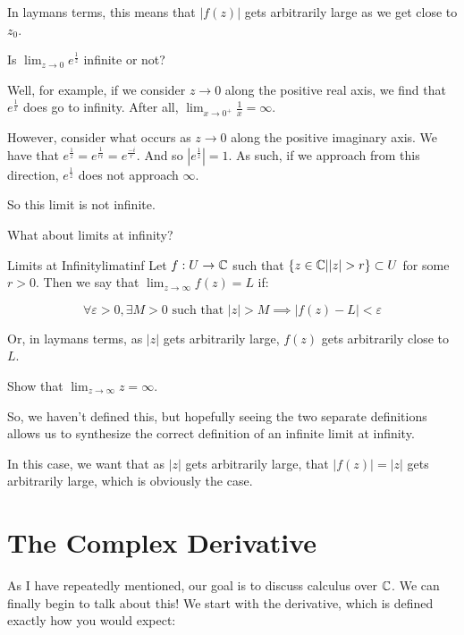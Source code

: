 In laymans terms, this means that $|f(z)|$ gets arbitrarily large as we get close to $z_0$.

\begin{ex}{}{} Is $\lim_{z\rightarrow 0} e^{\frac{1}{z}}$ infinite or not?

Well, for example, if we consider $z\rightarrow 0$ along the positive real axis, we find that $e^{\frac{1}{x}}$ does go to infinity. After all, $\lim_{x\rightarrow 0^+}\frac{1}{x}=\infty$.

However, consider what occurs as $z\rightarrow 0$ along the positive imaginary axis. We have that $e^{\frac{1}{z}} = e^{\frac{1}{ri}} = e^{\frac{-i}{r}}$. And so $|e^{\frac{1}{z}}| = 1$. As such, if we approach from this direction, $e^{\frac{1}{z}}$ does not approach $\infty$.

So this limit is not infinite.
\end{ex}

What about limits at infinity?

\begin{defbo}{Limits at Infinity}{limatinf}
Let $f:U\rightarrow \mathbb{C}$ such that $\{z\in \mathbb{C}| |z| > r\} \subset U$ for some $r > 0$. Then we say that $\lim_{z\rightarrow \infty} f(z) = L$ if:

$$\forall \varepsilon > 0, \exists M > 0 \text{ such that } |z| > M \implies |f(z) - L| < \varepsilon$$
\end{defbo}

Or, in laymans terms, as $|z|$ gets arbitrarily large, $f(z)$ gets arbitrarily close to $L$.

\begin{ex}{}{} Show that $\lim_{z\rightarrow \infty} z = \infty$.

So, we haven't defined this, but hopefully seeing the two separate definitions allows us to synthesize the correct definition of an infinite limit at infinity.

In this case, we want that as $|z|$ gets arbitrarily large, that $|f(z)| = |z|$ gets arbitrarily large, which is obviously the case.
\end{ex}

\section{The Complex Derivative}

As I have repeatedly mentioned, our goal is to discuss calculus over $\mathbb{C}$. We can finally begin to talk about this! We start with the derivative, which is defined exactly how you would expect:

